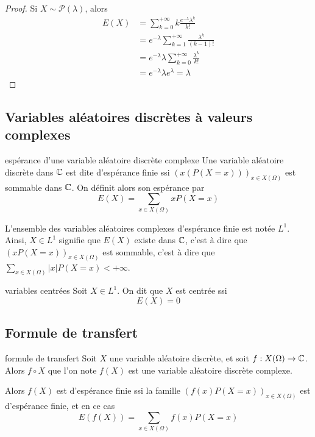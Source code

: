 \begin{proof}
    Si $X \sim \mathcal P(\lambda)$, alors 
    \begin{align}
        E(X) & = \sum_{k = 0}^{+ \infty} k \frac{e^{- \lambda} \lambda^k}{k!} \\
        & = e^{- \lambda} \sum_{k = 1}^{+ \infty} \frac{\lambda^k}{(k - 1)!} \\
        & = e^{- \lambda} \lambda \sum_{k = 0}^{+ \infty} \frac{\lambda^k}{k!} \\
        & = e^{- \lambda} \lambda e^{\lambda} = \lambda
    \end{align}
\end{proof}

\subsection{Variables aléatoires discrètes à valeurs complexes}

\begin{definition}{espérance d'une variable aléatoire discrète complexe}{}
    Une variable aléatoire discrète dans $\mathbb{C}$ est dite d'espérance finie ssi 
    $(x(P(X = x)))_{x \in X(\Omega)}$ est sommable dans $\mathbb{C}$. On définit alors 
    son espérance par 
    $$ E(X) = \sum_{x \in X(\Omega)} x P(X = x) $$

    L'ensemble des variables aléatoires complexes d'espérance finie est notée $L^1$.
    Ainsi, $X \in L^1$ signifie que $E(X)$ existe dans $\mathbb{C}$, c'est à dire que 
    $(x P(X = x))_{x \in X(\Omega)}$ est sommable, c'est à dire que 
    $\displaystyle \sum_{x \in X(\Omega)} |x| P(X = x) < + \infty   $.
\end{definition}

\begin{definition}{variables centrées}{}
    Soit $X \in L^1$. On dit que $X$ est centrée ssi 
    $$ E(X) = 0 $$    
\end{definition}

\subsection{Formule de transfert}

\begin{theoreme}{formule de transfert}{}
    Soit $X$ une variable aléatoire discrète, et soit $f : X(\Omega) \to \mathbb{C}$.
    Alors $f \circ X$ que l'on note $f(X)$ est une variable aléatoire discrète complexe. 

    Alors $f(X)$ est d'espérance finie ssi la famille $(f(x) P(X = x))_{x \in X(\Omega)}$ 
    est d'espérance finie, et en ce cas
    $$ E(f(X)) = \sum_{x \in X(\Omega)} f(x) P(X = x) $$
\end{theoreme}

